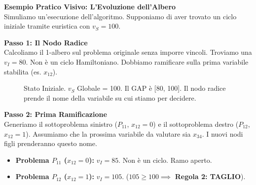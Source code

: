 \documentclass[12pt, a4paper]{article}
\newcommand{\separatore}{\noindent{\color{titlecolor!50}\rule{\textwidth}{0.6pt}}}
\begin{document}
	\vspace{0.6cm}
	\separatore
	\vspace{0.4cm}
	
	\textbf{Esempio Pratico Visivo: L'Evoluzione dell'Albero}\\
	Simuliamo un'esecuzione dell'algoritmo. Supponiamo di aver trovato un ciclo iniziale tramite euristica con $v_S = 100$.
	
	\textbf{Passo 1: Il Nodo Radice}\\
	Calcoliamo il 1-albero sul problema originale senza imporre vincoli. Troviamo una $v_I = 80$. Non è un ciclo Hamiltoniano. Dobbiamo ramificare sulla prima variabile stabilita (es. $x_{12}$).
	
	\begin{figure}[H]
		\centering
		\caption{Stato Iniziale. $v_S$ Globale = 100. Il GAP è [80, 100]. Il nodo radice prende il nome della variabile su cui stiamo per decidere.}
	\end{figure}
	
	\textbf{Passo 2: Prima Ramificazione}\\
	Generiamo il sottoproblema sinistro ($P_{11}$, $x_{12}=0$) e il sottoproblema destro ($P_{12}$, $x_{12}=1$). Assumiamo che la prossima variabile da valutare sia $x_{34}$. I nuovi nodi figli prenderanno questo nome.
	\begin{itemize}[label=$\circ$, itemsep=2pt, leftmargin=1.5cm]
		\item \textbf{Problema $P_{11}$ ($x_{12}=0$):} $v_I = 85$. Non è un ciclo. Ramo aperto.
		\item \textbf{Problema $P_{12}$ ($x_{12}=1$):} $v_I = 105$. ($105 \geq 100 \implies$ \textbf{Regola 2: TAGLIO}).
	\end{itemize}
	
\end{document}
